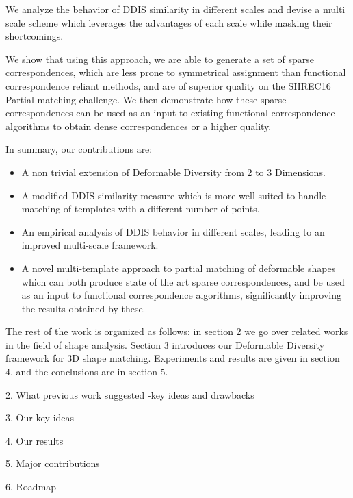 \documentclass[10pt,twocolumn,letterpaper]{article}
\begin{document}
We analyze the behavior of DDIS similarity in different scales and devise a multi scale scheme which leverages the advantages of each scale while masking their shortcomings.

We show that using this approach, we are able to generate a set of sparse correspondences, which are less prone to symmetrical assignment than functional correspondence reliant methods, and are of superior quality on the SHREC16 Partial matching challenge\cite{cosmo2016shrec}. We then demonstrate how these sparse correspondences can be used as an input to existing functional correspondence algorithms to obtain dense correspondences or a higher quality.

In summary, our contributions are:
\begin{itemize}
	\item A non trivial extension of Deformable Diversity from 2 to 3 Dimensions.
	\item A modified DDIS similarity measure which is more well suited to handle matching of templates with a different number of points.
	\item An empirical analysis of DDIS behavior in different scales, leading to an improved multi-scale framework.
	\item A novel multi-template approach to partial matching of deformable shapes which can both produce state of the art sparse correspondences, and be used as an input to functional correspondence algorithms, significantly improving the results obtained by these.
\end{itemize}

The rest of the work is organized as follows: in section 2 we go over related works in the field of shape analysis. Section 3 introduces our Deformable Diversity framework for 3D shape matching. Experiments and results are given in section 4, and the conclusions are in section 5.
{\color{red}
	2. What previous work suggested -key ideas and drawbacks
	
	3. Our key ideas
	
	4. Our results 
	
	5. Major contributions
	
	6. Roadmap}

\end{document}
